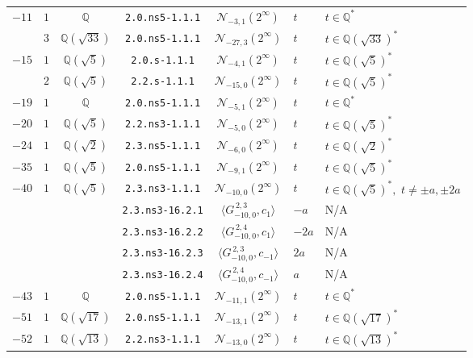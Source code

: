 \documentclass[11pt]{amsart}
\theoremstyle{definition}
\newcommand{\Q}{\mathbb Q}
\newcommand{\QQ}{\mathbb Q}
\begin{document}
{\begin{longtable}{|c|c|c|c|c|l|l|}
           {$-11$} & $1$ &$\QQ$ & \texttt{2.0.ns5-1.1.1} & $\mathcal N_{-3, 1}(2^{\infty})$ & $t$ & $t\in \Q^*$ \\ \cline{2-7}
          & $3$ & $\QQ(\sqrt{33})$ & \texttt{2.0.ns5-1.1.1} & $\mathcal N_{-27, 3}(2^{\infty})$ & $t$ & $t\in \Q(\sqrt{33})^*$ \\ \hline
{$-15$}  & $1$& $\QQ(\sqrt{5})$ &  \texttt{2.0.s-1.1.1} & $\mathcal N_{-4, 1}(2^{\infty})$ & $t$ & $t\in \Q(\sqrt{5})^*$ \\ \cline{2-7}
 & $2$ & $\QQ(\sqrt{5})$ & \texttt{2.2.s-1.1.1} & $\mathcal N_{-15, 0}(2^{\infty})$ & $t$ & $t\in \Q(\sqrt{5})^*$ \\ \hline

          
         $-19$ & $1$ & $\QQ$& \texttt{2.0.ns5-1.1.1} & $\mathcal N_{-5, 1}(2^{\infty})$ & $t$ & $t\in \Q^*$ \\ \hline
    
$-20$ & $1$ & $\QQ(\sqrt{5})$ & \texttt{2.2.ns3-1.1.1} & $\mathcal N_{-5, 0}(2^{\infty})$ & $t$ & $t\in \Q(\sqrt{5})^*$ \\ \hline
$-24$ & $1$ & $\QQ(\sqrt{2})$& \texttt{2.3.ns5-1.1.1} & $\mathcal N_{-6, 0}(2^{\infty})$ & $t$ & $t\in \Q(\sqrt{2})^*$ \\ \hline
$-35$ & $1$ & $\QQ(\sqrt{5})$ & \texttt{2.0.ns5-1.1.1} & $\mathcal N_{-9, 1}(2^{\infty})$ & $t$ & $t\in \Q(\sqrt{5})^*$ \\ \hline
{$-40$}   & {$1$} & {$\QQ(\sqrt{5})$} & \texttt{2.3.ns3-1.1.1} & $\mathcal N_{-10,0}(2^{\infty})$ &   $t$  &  $t\in \Q(\sqrt{5})^*,\,\, t\ne \pm a, \pm 2a$ \\  \cline{4-7} 
 & & & \texttt{2.3.ns3-16.2.1} & $\langle G^{\, 2,3}_{-10,0},c_{1}\rangle$ &   $-a$  &  N/A \\ \cline{4-7}   
 & & & \texttt{2.3.ns3-16.2.2} & $\langle G^{\, 2,4}_{-10,0},c_{1}\rangle$ &   $-2a$ &   N/A \\ \cline{4-7}   
 & & & \texttt{2.3.ns3-16.2.3} & $\langle G^{\, 2,3}_{-10,0},c_{-1}\rangle$ &  $2a$  & N/A \\ \cline{4-7}   
 & & & \texttt{2.3.ns3-16.2.4} & $\langle G^{\, 2,4}_{-10,0},c_{-1}\rangle$ &   $a$  &   N/A\\ \hline 
       $-43$ & $1$ & $\QQ$& \texttt{2.0.ns5-1.1.1} & $\mathcal N_{-11, 1}(2^{\infty})$ & $t$ & $t\in \Q^*$ \\ \hline
$-51$ & $1$ & $\QQ(\sqrt{17})$ & \texttt{2.0.ns5-1.1.1} & $\mathcal N_{-13, 1}(2^{\infty})$ & $t$ & $t\in \Q(\sqrt{17})^*$ \\ \hline
$-52$ & $1$& $\QQ(\sqrt{13})$ &  \texttt{2.2.ns3-1.1.1} & $\mathcal N_{-13, 0}(2^{\infty})$ & $t$ & $t\in \Q(\sqrt{13})^*$ \\ \hline



\end{longtable}}
\end{document}

